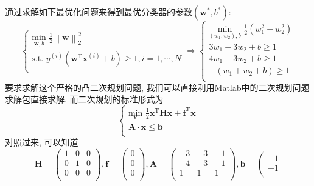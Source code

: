 \documentclass{article}
\begin{document}
\begin{homeworkProblem}
	\solution 通过求解如下最优化问题来得到最优分类器的参数$\left( \boldsymbol{w}^{\ast},b^{\ast} \right)$:
	$$
	\begin{cases}
		\displaystyle \underset{\boldsymbol{w},b}{\text{min}}\,\,\frac{1}{2}\left\| \boldsymbol{w} \right\| _{2}^{2}\\
		\text{s}.\text{t}.\,\, y^{\left( i \right)}\left( \boldsymbol{w}^{\text{T}}\boldsymbol{x}^{\left( i \right)}+b \right) \ge 1,i=1,\cdots ,N\\
	\end{cases}\Rightarrow 
	\begin{cases}
		\displaystyle \underset{\left( w_1,w_2 \right) ,b}{\text{min}}\,\,\frac{1}{2}\left( w_{1}^{2}+w_{2}^{2} \right)\\
		3w_1+3w_2+b\ge 1\\
		4w_1+3w_2+b\ge 1\\
		-\left( w_1+w_2+b \right) \ge 1\\
	\end{cases}
	$$
	要求求解这个严格的凸二次规划问题, 我们可以直接利用Matlab中的二次规划问题求解包直接求解. 而二次规划的标准形式为
	$$
	\begin{cases}
		\displaystyle \underset{\boldsymbol{x}}{\text{min}}\,\,\frac{1}{2}\boldsymbol{x}^{\text{T}}\boldsymbol{Hx}+\boldsymbol{f}^{\text{T}}\boldsymbol{x}\\
		\boldsymbol{A}\cdot \boldsymbol{x}\le \boldsymbol{b}\\
	\end{cases}
	$$
	对照过来, 可以知道
	$$
	\boldsymbol{H}=\left( \begin{matrix}
		1&		0&		0\\
		0&		1&		0\\
		0&		0&		0\\
	\end{matrix} \right) , \boldsymbol{f}=\left( \begin{array}{c}
		0\\
		0\\
		0\\
	\end{array} \right) , \boldsymbol{A}=\left( \begin{matrix}
		-3&		-3&		-1\\
		-4&		-3&		-1\\
		1&		1&		1\\
	\end{matrix} \right) , \boldsymbol{b}=\left( \begin{array}{c}
		-1\\
		-1\\

\end{array}$$
\end{homeworkProblem}
\end{document}
